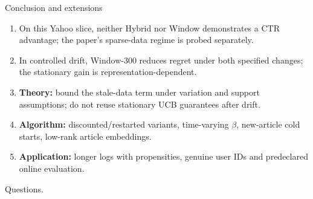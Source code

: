 \documentclass[10pt,aspectratio=169]{beamer}
\begin{document}
\begin{frame}{Conclusion and extensions}
\begin{enumerate}
\item On this Yahoo slice, neither Hybrid nor Window demonstrates a CTR advantage; the paper's sparse-data regime is probed separately.
\item In controlled drift, Window-300 reduces regret under both specified changes; the stationary gain is representation-dependent.
\item \textbf{Theory:} bound the stale-data term under variation and support assumptions; do not reuse stationary UCB guarantees after drift.
\item \textbf{Algorithm:} discounted/restarted variants, time-varying $\beta$, new-article cold starts, low-rank article embeddings.
\item \textbf{Application:} longer logs with propensities, genuine user IDs and predeclared online evaluation.
\end{enumerate}
\vspace{4pt}
Questions.
\end{frame}
\end{document}
